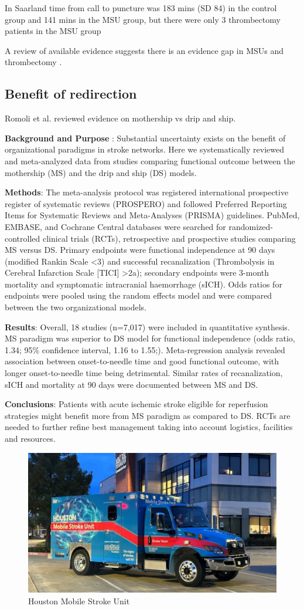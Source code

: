 In Saarland \cite{helwig_prehospital_2019} time from call to puncture was 183 mins (SD 84) in the control group and 141 mins in the MSU group, but there were only 3 thrombectomy patients in the MSU group


A review of available evidence suggests there is an evidence gap in MSUs and thrombectomy \cite{navi_mobile_2022}.

\subsection{Benefit of redirection}

Romoli et al. \cite{romoli_mothership_2020} reviewed evidence on mothership vs drip and ship. 

\textbf{Background and Purpose} : Substantial uncertainty exists on the benefit of organizational paradigms in stroke networks. Here we systematically reviewed and meta-analyzed data from studies comparing functional outcome between the mothership (MS) and the drip and ship (DS) models.

\textbf{Methods}: The meta-analysis protocol was registered international prospective register of systematic reviews (PROSPERO) and followed Preferred Reporting Items for Systematic Reviews and Meta-Analyses (PRISMA) guidelines. PubMed, EMBASE, and Cochrane Central databases were searched for randomized-controlled clinical trials (RCTs), retrospective and prospective studies comparing MS versus DS. Primary endpoints were functional independence at 90 days (modified Rankin Scale <3) and successful recanalization (Thrombolysis in Cerebral Infarction Scale [TICI] >2a); secondary endpoints were 3-month mortality and symptomatic intracranial haemorrhage (sICH). Odds ratios for endpoints were pooled using the random effects model and were compared between the two organizational models.

\textbf{Results}:  Overall, 18 studies (n=7,017) were included in quantitative synthesis. MS paradigm was superior to DS model for functional independence (odds ratio, 1.34; 95\% confidence interval, 1.16 to 1.55;). Meta-regression analysis revealed association between onset-to-needle time and good functional outcome, with longer onset-to-needle time being detrimental. Similar rates of recanalization, sICH and mortality at 90 days were documented between MS and DS.

\textbf{Conclusions}: Patients with acute ischemic stroke eligible for reperfusion strategies might benefit more from MS paradigm as compared to DS. RCTs are needed to further refine best management taking into account logistics, facilities and resources.




\begin{figure}
    \centering
    \includegraphics[width=0.5\linewidth]{images_background/houston_msu.jpeg}
    \caption{Houston Mobile Stroke Unit}
    \label{fig:houston_msu}
\end{figure}
